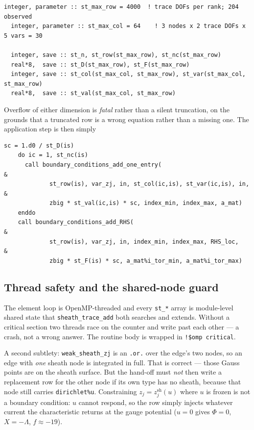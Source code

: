\documentclass[11pt,a4paper]{article}
\newcommand{\zj}{z_j}
\newcommand{\zjsh}{z^{\mathrm{sh}}_{j}}
\newcommand{\code}[1]{\texttt{\small #1}}
\begin{document}
\begin{lstlisting}[caption={The accumulator state (\texttt{mod\_sheath\_trace.f90}).}]
  integer, parameter :: st_max_row = 4000  ! trace DOFs per rank; 204 observed
  integer, parameter :: st_max_col = 64    ! 3 nodes x 2 trace DOFs x 5 vars = 30

  integer, save :: st_n, st_row(st_max_row), st_nc(st_max_row)
  real*8,  save :: st_D(st_max_row), st_F(st_max_row)
  integer, save :: st_col(st_max_col, st_max_row), st_var(st_max_col, st_max_row)
  real*8,  save :: st_val(st_max_col, st_max_row)
\end{lstlisting}

Overflow of either dimension is \emph{fatal} rather than a silent truncation, on the grounds that a
truncated row is a wrong equation rather than a missing one. The application step is then simply

\begin{lstlisting}[caption={Normalisation and row writing (\texttt{sheath\_trace\_apply}).}]
    sc = 1.d0 / st_D(is)
    do ic = 1, st_nc(is)
      call boundary_conditions_add_one_entry(                          &
             st_row(is), var_zj, in, st_col(ic,is), st_var(ic,is), in, &
             zbig * st_val(ic,is) * sc, index_min, index_max, a_mat)
    enddo
    call boundary_conditions_add_RHS(                                  &
             st_row(is), var_zj, in, index_min, index_max, RHS_loc,    &
             zbig * st_F(is) * sc, a_mat%i_tor_min, a_mat%i_tor_max)
\end{lstlisting}

\subsection{Thread safety and the shared-node guard}

The element loop is OpenMP-threaded and every \code{st\_*} array is module-level shared state that
\code{sheath\_trace\_add} both searches and extends. Without a critical section two threads race on
the counter and write past each other --- a crash, not a wrong answer. The routine body is wrapped in
\code{!\$omp critical}.

A second subtlety: \code{weak\_sheath\_zj} is an \code{.or.} over the edge's two nodes, so an edge with
\emph{one} sheath node is integrated in full. That is correct --- those Gauss points are on the sheath
surface. But the hand-off must \emph{not} then write a replacement row for the other node if its own
type has no sheath, because that node still carries \code{dirichlet\%u}. Constraining $\zj=\zjsh(u)$
where $u$ is frozen is not a boundary condition: $u$ cannot respond, so the row simply injects
whatever current the characteristic returns at the gauge potential ($u=0$ gives $\Phi=0$, $X=-\Lambda$,
$f\approx-19$).
\end{document}
